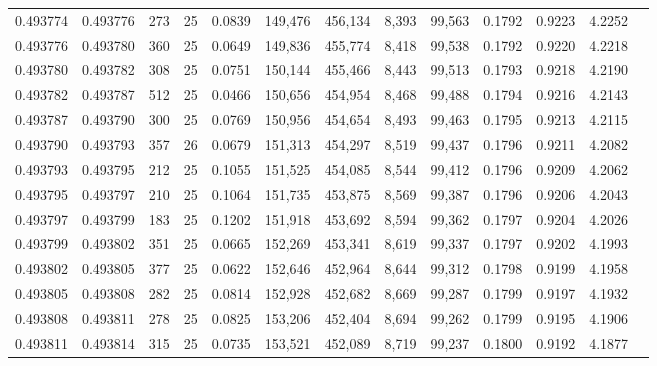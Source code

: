 \begin{tabular}{rrrrrrrrrrrrr}
0.493774 & 0.493776 &   273 &  25 &                                     0.0839 & 149,476 & 456,134 &   8,393 &  99,563 & 0.1792 & 0.9223 & 4.2252 \\
0.493776 & 0.493780 &   360 &  25 &                                     0.0649 & 149,836 & 455,774 &   8,418 &  99,538 & 0.1792 & 0.9220 & 4.2218 \\
0.493780 & 0.493782 &   308 &  25 &                                     0.0751 & 150,144 & 455,466 &   8,443 &  99,513 & 0.1793 & 0.9218 & 4.2190 \\
0.493782 & 0.493787 &   512 &  25 &                                     0.0466 & 150,656 & 454,954 &   8,468 &  99,488 & 0.1794 & 0.9216 & 4.2143 \\
0.493787 & 0.493790 &   300 &  25 &                                     0.0769 & 150,956 & 454,654 &   8,493 &  99,463 & 0.1795 & 0.9213 & 4.2115 \\
0.493790 & 0.493793 &   357 &  26 &                                     0.0679 & 151,313 & 454,297 &   8,519 &  99,437 & 0.1796 & 0.9211 & 4.2082 \\
0.493793 & 0.493795 &   212 &  25 &                                     0.1055 & 151,525 & 454,085 &   8,544 &  99,412 & 0.1796 & 0.9209 & 4.2062 \\
0.493795 & 0.493797 &   210 &  25 &                                     0.1064 & 151,735 & 453,875 &   8,569 &  99,387 & 0.1796 & 0.9206 & 4.2043 \\
0.493797 & 0.493799 &   183 &  25 &                                     0.1202 & 151,918 & 453,692 &   8,594 &  99,362 & 0.1797 & 0.9204 & 4.2026 \\
0.493799 & 0.493802 &   351 &  25 &                                     0.0665 & 152,269 & 453,341 &   8,619 &  99,337 & 0.1797 & 0.9202 & 4.1993 \\
0.493802 & 0.493805 &   377 &  25 &                                     0.0622 & 152,646 & 452,964 &   8,644 &  99,312 & 0.1798 & 0.9199 & 4.1958 \\
0.493805 & 0.493808 &   282 &  25 &                                     0.0814 & 152,928 & 452,682 &   8,669 &  99,287 & 0.1799 & 0.9197 & 4.1932 \\
0.493808 & 0.493811 &   278 &  25 &                                     0.0825 & 153,206 & 452,404 &   8,694 &  99,262 & 0.1799 & 0.9195 & 4.1906 \\
0.493811 & 0.493814 &   315 &  25 &                                     0.0735 & 153,521 & 452,089 &   8,719 &  99,237 & 0.1800 & 0.9192 & 4.1877 \\

\end{tabular}
